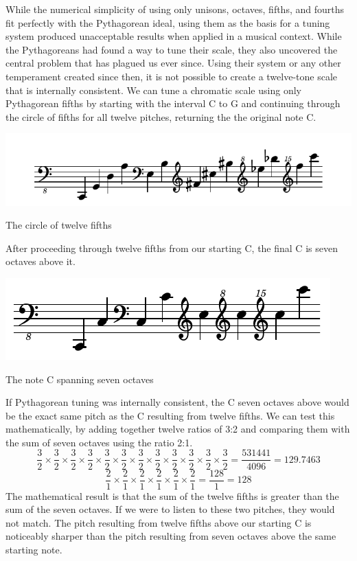While the numerical simplicity of using only unisons, octaves, fifths, and fourths fit
perfectly with the Pythagorean ideal, using them as the basis for a tuning system produced
unacceptable results when applied in a musical context. While the Pythagoreans had found
a way to tune their scale, they also uncovered the central problem that has plagued us ever
since. Using their system or any other temperament created since then, it is not possible
to create a twelve-tone scale that is internally consistent. We can tune a chromatic
scale using only Pythagorean fifths by starting with the interval C to G and continuing
through the circle of fifths for all twelve pitches, returning the the original note C.
\begin{example}[h]
\centering
\includegraphics{examples/12-fifths.pdf}
\caption{The circle of twelve fifths}
\end{example}
After proceeding through twelve fifths from our starting C, the final C is seven octaves
above it.
\begin{example}[h]
\centering
\includegraphics{examples/7-octaves.pdf}
\caption{The note C spanning seven octaves}
\end{example}
If Pythagorean tuning was internally consistent, the C seven octaves above would be the
exact same pitch as the C resulting from twelve fifths. We can test this mathematically,
by adding together twelve ratios of 3:2 and comparing them with the sum of seven octaves
using the ratio 2:1.\autocite[25]{RD:1}
\begin{equation}
  \frac{3}{2} \times
  \frac{3}{2} \times
  \frac{3}{2} \times
  \frac{3}{2} \times
  \frac{3}{2} \times
  \frac{3}{2} \times
  \frac{3}{2} \times
  \frac{3}{2} \times
  \frac{3}{2} \times
  \frac{3}{2} \times
  \frac{3}{2} \times
  \frac{3}{2} = \frac{531441}{4096} = 129.7463
\end{equation}
\begin{equation}
  \frac{2}{1} \times
  \frac{2}{1} \times
  \frac{2}{1} \times
  \frac{2}{1} \times
  \frac{2}{1} \times
  \frac{2}{1} = \frac{128}{1} = 128
\end{equation}
The mathematical result is that the sum of the twelve fifths is greater than the sum of
the seven octaves. If we were to listen to these two pitches, they would not match.
The pitch resulting from twelve fifths above our starting C is noticeably sharper than 
the pitch resulting from seven octaves above the same starting note.

